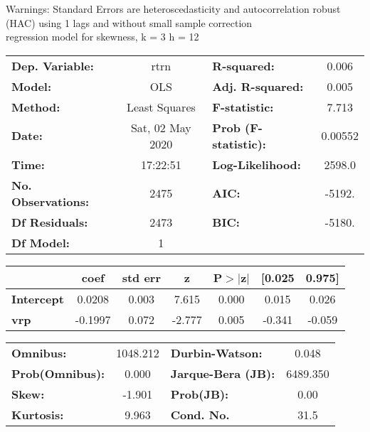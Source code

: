 Warnings: \newline
 [1] Standard Errors are heteroscedasticity and autocorrelation robust (HAC) using 1 lags and without small sample correction\\ 

regression model for skewness, k = 3 h = 12\begin{center}
\begin{tabular}{lclc}
\toprule
\textbf{Dep. Variable:}    &       rtrn       & \textbf{  R-squared:         } &     0.006   \\
\textbf{Model:}            &       OLS        & \textbf{  Adj. R-squared:    } &     0.005   \\
\textbf{Method:}           &  Least Squares   & \textbf{  F-statistic:       } &     7.713   \\
\textbf{Date:}             & Sat, 02 May 2020 & \textbf{  Prob (F-statistic):} &  0.00552    \\
\textbf{Time:}             &     17:22:51     & \textbf{  Log-Likelihood:    } &    2598.0   \\
\textbf{No. Observations:} &        2475      & \textbf{  AIC:               } &    -5192.   \\
\textbf{Df Residuals:}     &        2473      & \textbf{  BIC:               } &    -5180.   \\
\textbf{Df Model:}         &           1      & \textbf{                     } &             \\
\bottomrule
\end{tabular}
\begin{tabular}{lcccccc}
                   & \textbf{coef} & \textbf{std err} & \textbf{z} & \textbf{P$> |$z$|$} & \textbf{[0.025} & \textbf{0.975]}  \\
\midrule
\textbf{Intercept} &       0.0208  &        0.003     &     7.615  &         0.000        &        0.015    &        0.026     \\
\textbf{vrp}       &      -0.1997  &        0.072     &    -2.777  &         0.005        &       -0.341    &       -0.059     \\
\bottomrule
\end{tabular}
\begin{tabular}{lclc}
\textbf{Omnibus:}       & 1048.212 & \textbf{  Durbin-Watson:     } &    0.048  \\
\textbf{Prob(Omnibus):} &   0.000  & \textbf{  Jarque-Bera (JB):  } & 6489.350  \\
\textbf{Skew:}          &  -1.901  & \textbf{  Prob(JB):          } &     0.00  \\
\textbf{Kurtosis:}      &   9.963  & \textbf{  Cond. No.          } &     31.5  \\
\bottomrule
\end{tabular}
\end{center}

